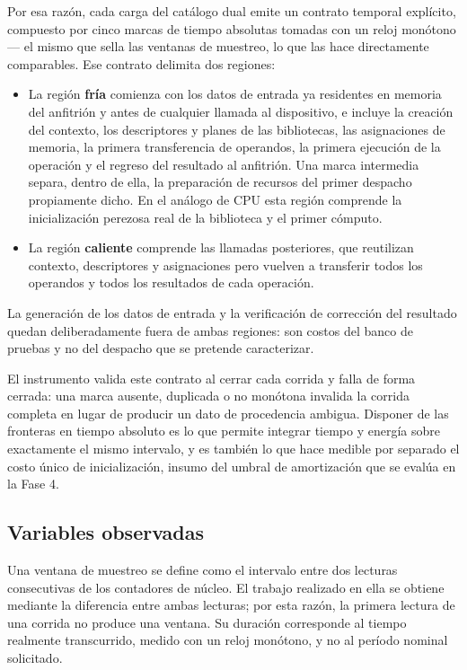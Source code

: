 \documentclass[12pt,oneside,spanish]{book}
\begin{document}
Por esa razón, cada carga del catálogo dual emite un contrato temporal explícito, compuesto por cinco marcas de tiempo absolutas tomadas con un reloj monótono --- el mismo que sella las ventanas de muestreo, lo que las hace directamente comparables. Ese contrato delimita dos regiones:

\begin{itemize}
    \item La región \textbf{fría} comienza con los datos de entrada ya residentes en memoria del anfitrión y antes de cualquier llamada al dispositivo, e incluye la creación del contexto, los descriptores y planes de las bibliotecas, las asignaciones de memoria, la primera transferencia de operandos, la primera ejecución de la operación y el regreso del resultado al anfitrión. Una marca intermedia separa, dentro de ella, la preparación de recursos del primer despacho propiamente dicho. En el análogo de CPU esta región comprende la inicialización perezosa real de la biblioteca y el primer cómputo.
    \item La región \textbf{caliente} comprende las llamadas posteriores, que reutilizan contexto, descriptores y asignaciones pero vuelven a transferir todos los operandos y todos los resultados de cada operación.
\end{itemize}

La generación de los datos de entrada y la verificación de corrección del resultado quedan deliberadamente fuera de ambas regiones: son costos del banco de pruebas y no del despacho que se pretende caracterizar.

El instrumento valida este contrato al cerrar cada corrida y falla de forma cerrada: una marca ausente, duplicada o no monótona invalida la corrida completa en lugar de producir un dato de procedencia ambigua. Disponer de las fronteras en tiempo absoluto es lo que permite integrar tiempo y energía sobre exactamente el mismo intervalo, y es también lo que hace medible por separado el costo único de inicialización, insumo del umbral de amortización que se evalúa en la Fase 4.

\subsection{Variables observadas}

Una ventana de muestreo se define como el intervalo entre dos lecturas
consecutivas de los contadores de núcleo. El trabajo realizado en ella se
obtiene mediante la diferencia entre ambas lecturas; por esta razón, la
primera lectura de una corrida no produce una ventana. Su duración corresponde
al tiempo realmente transcurrido, medido con un reloj monótono, y no al
período nominal solicitado.
\end{document}

